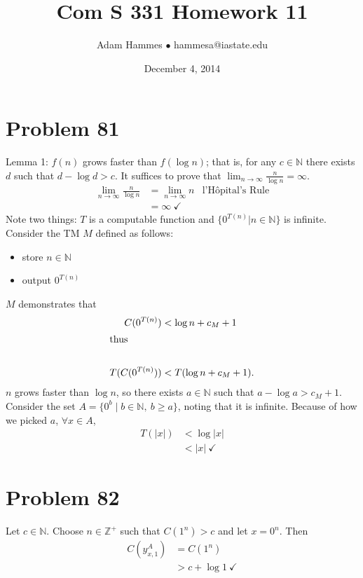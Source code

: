 \documentclass[11pt]{article}
\let\imp\rightarrow
\begin{document}
\title{Com S 331 Homework 11}
\author{Adam Hammes $\bullet$ hammesa@iastate.edu}
\date{December 4, 2014}
\maketitle


\section*{Problem 81}

Lemma 1: $f(n)$ grows faster than $f( \log n)$; that is, for any $c \in \mathbb{N}$ there exists $d$ such that $d - \log d > c$. 
It suffices to prove that $\lim _{n \imp \infty} \frac{n}{\log n}= \infty$.
	\begin{align*}
		\lim _{n \imp \infty} \frac{n}{\log n}  &= \lim _{n \imp \infty} n &\text{l'H\^{o}pital's Rule} \\
		&= \infty \ \checkmark
	\end{align*}
Note two things: $T$ is a computable function and $\{ 0^{T(n)} | n \in \mathbb{N} \}$ is infinite.
Consider the TM $M$ defined as follows:
	\begin{itemize}
		\item store $n \in \mathbb{N}$
		\item output $0^{T(n)}$
	\end{itemize}
$M$ demonstrates that
	\begin{align*}
		C( 0^{T(n)} ) &< \log n + c_M + 1 \\
		\intertext{thus} \\
		T( C( 0^{T(n)}) ) &< T( \log n + c_M +1 ).
	\end{align*}
$n$ grows faster than $\log n$, so there exists $a \in \mathbb{N}$ such that $a - \log a > c_M + 1$.
Consider the set $A = \{ 0^b \mid b \in \mathbb{N},\ b \geq a \}$, noting that it is infinite.
Because of how we picked $a$, $\forall x \in A$,
	\begin{align*}
		T(|x|) &< \log |x| \\
		&< |x| \ \checkmark
	\end{align*}


\section*{Problem 82}

Let $c \in \mathbb{N}$. Choose $n \in \mathbb{Z}^+$ such that $C(1^n) > c$ and let $x = 0^n$.
Then
	\begin{align*}
		C(y_{x,1} ^A) &= C(1^n) \\
		&> c + \log 1 \ \checkmark
	\end{align*}
\end{document}
